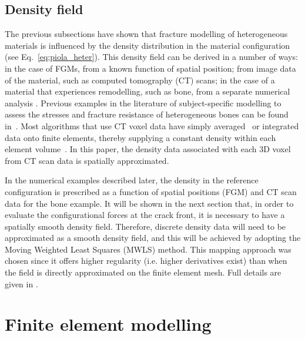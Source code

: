 \documentclass[onecolumn]{svjour3}
\begin{document}
\subsection{Density field}
\label{sec:dens_mapping}
The previous subsections have shown that fracture modelling of heterogeneous materials is influenced by the density distribution in the material configuration (see Eq.~\ref{eq:piola_heter}). This density field can be derived in a number of ways: in the case of FGMs, from a known function of spatial position; from image data of the material, such as computed tomography (CT) scans; in the case of a material that experiences remodelling, such as bone, from a separate numerical analysis \cite{kuhl2003theory,kaczmarczyk2011efficient}. Previous examples in the literature of subject-specific modelling to assess the stresses and fracture resistance of heterogeneous bones can be found in~\cite{poelert2013patient,Helgason2008b,yosibash2010predicting}. Most algorithms that use CT voxel data have simply averaged~\cite{zannoni1999material} or integrated data onto finite elements, thereby supplying a constant density within each element volume~\cite{taddei2007material, schileo2008subject}. In this paper, the density data associated with each 3D voxel from CT scan data is spatially approximated. 

In the numerical examples described later, the density in the reference configuration is prescribed as a function of spatial positions (FGM) and CT scan data for the bone example. It will be shown in the next section that, in order to evaluate the configurational forces at the crack front, it is necessary to have a spatially smooth density field. Therefore, discrete density data will need to be approximated as a smooth density field, and this will be achieved by adopting the Moving Weighted Least Squares (MWLS) method. This mapping approach was chosen since it offers higher regularity (i.e. higher derivatives exist) than when the field is
directly approximated on the finite element mesh. Full details are given in \cite{karol_lewandowski_moving_2019}.  %
% 
\section{Finite element modelling} \label{sec:fem_modelling}
% 
\end{document}
